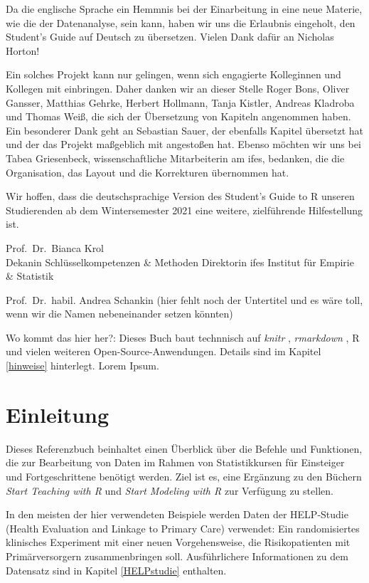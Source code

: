 \documentclass[
  ngerman,
]{scrbook}
\begin{document}
Da die englische Sprache ein Hemmnis bei der Einarbeitung in eine neue Materie, wie die der Datenanalyse, sein kann, haben wir uns die Erlaubnis eingeholt, den Student's Guide auf Deutsch zu übersetzen. Vielen Dank dafür an Nicholas Horton!

Ein solches Projekt kann nur gelingen, wenn sich engagierte Kolleginnen und Kollegen mit einbringen. Daher danken wir an dieser Stelle Roger Bons, Oliver Gansser, Matthias Gehrke, Herbert Hollmann, Tanja Kistler, Andreas Kladroba und Thomas Weiß, die sich der Übersetzung von Kapiteln angenommen haben. Ein besonderer Dank geht an Sebastian Sauer, der ebenfalls Kapitel übersetzt hat und der das Projekt maßgeblich mit angestoßen hat. Ebenso möchten wir uns bei Tabea Griesenbeck, wissenschaftliche Mitarbeiterin am ifes, bedanken, die die Organisation, das Layout und die Korrekturen übernommen hat.

Wir hoffen, dass die deutschsprachige Version des Student's Guide to R unseren Studierenden ab dem Wintersemester 2021 eine weitere, zielführende Hilfestellung ist.

Prof.~Dr.~Bianca Krol\\
Dekanin \textbar{} Schlüsselkompetenzen \& Methoden
Direktorin \textbar{} ifes Institut für Empirie \& Statistik

Prof.~Dr.~habil. Andrea Schankin
(hier fehlt noch der Untertitel und es wäre toll, wenn wir die Namen nebeneinander setzen könnten)

Wo kommt das hier her?: Dieses Buch baut technnisch auf \emph{knitr} \autocite{xie2015}, \emph{rmarkdown} \autocite{R-rmarkdown}, R \autocite{R-base} und vielen weiteren Open-Source-Anwendungen. Details sind im Kapitel \ref{hinweise} hinterlegt. Lorem Ipsum.

\hypertarget{einleitung}{%
\chapter{Einleitung}\label{einleitung}}

Dieses Referenzbuch beinhaltet einen Überblick über die Befehle und Funktionen, die zur Bearbeitung von Daten im Rahmen von Statistikkursen für Einsteiger und Fortgeschrittene benötigt werden. Ziel ist es, eine Ergänzung zu den Büchern \emph{Start Teaching with R} \autocite{TeachingR} und \emph{Start Modeling with R} \autocite{ModelingR} zur Verfügung zu stellen.

In den meisten der hier verwendeten Beispiele werden Daten der HELP-Studie (Health Evaluation and Linkage to Primary Care) verwendet: Ein randomisiertes klinisches Experiment mit einer neuen Vorgehensweise, die Risikopatienten mit Primärversorgern zusammenbringen soll. Ausführlichere Informationen zu dem Datensatz sind in Kapitel \ref{HELPstudie} enthalten.
\end{document}
